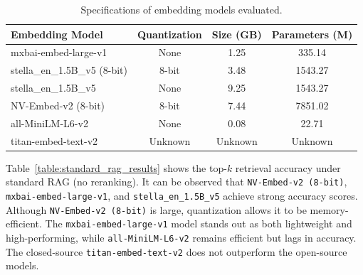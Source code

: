 \documentclass{scrartcl}
\begin{document}
\begin{table}[H]
\centering
\begin{tabular}{|l|c|c|c|}
\hline
\textbf{Embedding Model} & \textbf{Quantization} & \textbf{Size (GB)} & \textbf{Parameters (M)} \\ \hline
mxbai-embed-large-v1      & None   & 1.25 & 335.14 \\ \hline
stella\_en\_1.5B\_v5 (8-bit) & 8-bit & 3.48 & 1543.27 \\ \hline
stella\_en\_1.5B\_v5         & None  & 9.25 & 1543.27 \\ \hline
NV-Embed-v2 (8-bit)       & 8-bit & 7.44 & 7851.02 \\ \hline
all-MiniLM-L6-v2          & None  & 0.08 & 22.71 \\ \hline
titan-embed-text-v2       & Unknown & Unknown & Unknown \\ \hline
\end{tabular}
\caption{Specifications of embedding models evaluated.}
\label{table:model_specs}
\end{table}

Table~\ref{table:standard_rag_results} shows the top-$k$ retrieval accuracy under standard RAG (no reranking). It can be observed that \texttt{NV-Embed-v2 (8-bit)}, \texttt{mxbai-embed-large-v1}, and \texttt{stella\_en\_1.5B\_v5} achieve strong accuracy scores. Although \texttt{NV-Embed-v2 (8-bit)} is large, quantization allows it to be memory-efficient. The \texttt{mxbai-embed-large-v1} model stands out as both lightweight and high-performing, while \texttt{all-MiniLM-L6-v2} remains efficient but lags in accuracy. The closed-source \texttt{titan-embed-text-v2} does not outperform the open-source models.
\end{document}
